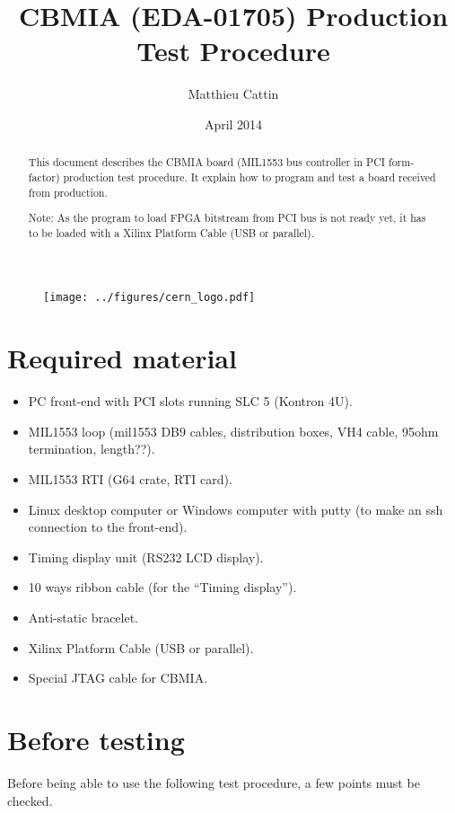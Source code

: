 \documentclass[11pt,a4paper]{article}
\title{CBMIA (EDA-01705) Production Test Procedure}
\author{Matthieu Cattin}
\date{April 2014}
\begin{document}
\begin{figure}[t]
	\texttt{[image: ../figures/cern\_logo.pdf]}
	\label{fig:cern_logo}
\end{figure}
\maketitle


\begin{abstract}
This document describes the CBMIA board (MIL1553 bus controller in PCI form-factor) production test procedure. It explain how to program and test a board received from production.

Note: As the program to load FPGA bitstream from PCI bus is not ready yet, it has to be loaded with a Xilinx Platform Cable (USB or parallel).
\end{abstract}

\newpage 

\section{Required material}

\begin{itemize}
	\item PC front-end with PCI slots running SLC 5 (Kontron 4U).
	\item MIL1553 loop (mil1553 DB9 cables, distribution boxes, VH4 cable, 95ohm termination, length??).
	\item MIL1553 RTI (G64 crate, RTI card).
	\item Linux desktop computer or Windows computer with putty (to make an ssh connection to the front-end).
	\item Timing display unit (RS232 LCD display).
	\item 10 ways ribbon cable (for the "`Timing display"').
	\item Anti-static bracelet.
	\item Xilinx Platform Cable (USB or parallel).
	\item Special JTAG cable for CBMIA.
\end{itemize}


\section{Before testing}
Before being able to use the following test procedure, a few points must be checked.
\end{document}
